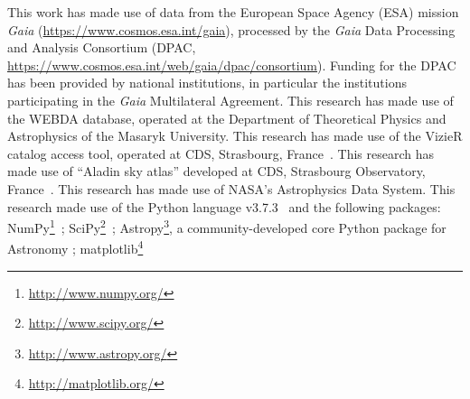\documentclass[draft]{aa}
\begin{document}
\begin{acknowledgements}
This work has made use of data from the European Space Agency (ESA) mission
{\it Gaia} (\url{https://www.cosmos.esa.int/gaia}), processed by the {\it Gaia}
Data Processing and Analysis Consortium (DPAC,
\url{https://www.cosmos.esa.int/web/gaia/dpac/consortium}). Funding for the DPAC
has been provided by national institutions, in particular the institutions
participating in the {\it Gaia} Multilateral Agreement.
%
This research has made use of the WEBDA database, operated at the Department of
Theoretical Physics and Astrophysics of the Masaryk University.
%
This research has made use of the VizieR catalog access tool, operated at CDS,
Strasbourg, France~\citep{Ochsenbein_2000}.
%
This research has made use of ``Aladin sky atlas'' developed at
CDS, Strasbourg Observatory, France~\citep{Bonnarel2000,Boch2014}.
%
This research has made use of NASA's Astrophysics Data System.
%
This research made use of the Python language v3.7.3~\citep{vanRossum_1995}
and the following packages:
NumPy\footnote{\url{http://www.numpy.org/}}~\citep{vanDerWalt_2011};
SciPy\footnote{\url{http://www.scipy.org/}}~\citep{Jones_2001};
Astropy\footnote{\url{http://www.astropy.org/}}, a community-developed core
Python package for Astronomy \citep{Astropy_2013};
matplotlib\footnote{\url{http://matplotlib.org/}}~\citep{hunter_2007}
\end{acknowledgements}





\end{document}
